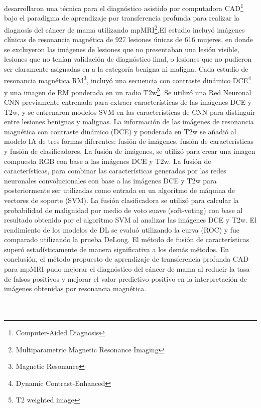 \cite{Hu2020} desarrollaron una técnica para el diagnóstico asistido por computadora CAD\footnote{Computer-Aided Diagnosis} bajo el paradigma de aprendizaje por transferencia profunda para realizar la diagnosis del cáncer de mama utilizando mpMRI\footnote{Multiparametric Magnetic Resonance Imaging}.El estudio incluyó imágenes clínicas de resonancia magnética de 927 lesiones únicas de 616 mujeres, en donde se excluyeron las imágenes de lesiones que no presentaban una lesión visible, lesiones que no tenían validación de diagnóstico final, o lesiones que no pudieron ser claramente asignadas en a la categoría benigna ni maligna. Cada estudio de resonancia magnética RM\footnote{Magnetic Resonance}, incluyó una secuencia con contraste dinámico DCE\footnote{Dynamic Contrast-Enhanced} y una imagen de RM ponderada en un radio T2w\footnote{T2 weighted image}. Se utilizó una Red Neuronal CNN previamente entrenada para extraer características de las imágenes DCE y T2w, y se entrenaron modelos SVM en las características de CNN para distinguir entre lesiones benignas y malignas. La información de las imágenes de resonancia magnética con contraste dinámico (DCE) y ponderada en T2w se añadió al modelo IA de tres formas diferentes: fusión de imágenes, fusión de características y fusión de clasificadores. La fusión de imágenes, se utilizó para crear una imagen compuesta RGB con base a las imágenes DCE y T2w. La fusión de características, para combinar las características generadas por las redes neuronales convolucionales con base a las imágenes DCE y T2w para posteriormente ser utilizadas como entrada en un algoritmo de máquina de vectores de soporte (SVM). La fusión clasificadora se utilizó para calcular la probabilidad de malignidad por medio de voto suave (soft-voting) con base al resultado obtenido por el algoritmo SVM al analizar las imágenes DCE y T2w. El rendimiento de los modelos de DL se evaluó utilizando la curva (ROC) y fue comparado utilizando la prueba DeLong. El método de fusión de características superó estadísticamente de manera significativa a los demás métodos. En conclusión, el método propuesto de aprendizaje de transferencia profunda CAD para mpMRI pudo mejorar el diagnóstico del cáncer de mama al reducir la tasa de falsos positivos y mejorar el valor predictivo positivo en la interpretación de imágenes obtenidas por resonancia magnética.
\\\\\\

